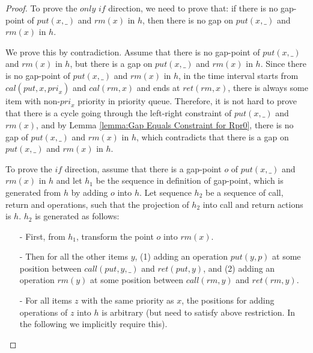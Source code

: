 \documentclass{llncs}
\begin{document}
\begin {proof}

To prove the $\textit{only if}$ direction, we need to prove that: if there is no gap-point of $\textit{put}(x,\_)$ and $\textit{rm}(x)$ in $h$, then there is no gap on $\textit{put}(x,\_)$ and $\textit{rm}(x)$ in $h$.

We prove this by contradiction. Assume that there is no gap-point of $\textit{put}(x,\_)$ and $\textit{rm}(x)$ in $h$, but there is a gap on $\textit{put}(x,\_)$ and $\textit{rm}(x)$ in $h$. Since there is no gap-point of $\textit{put}(x,\_)$ and $\textit{rm}(x)$ in $h$, in the time interval starts from $\textit{cal}(\textit{put},x,\textit{pri}_x)$ and $\textit{cal}(\textit{rm},x)$ and ends at $\textit{ret}(\textit{rm},x)$, there is always some item with non-$\textit{pri}_x$ priority in priority queue. Therefore, it is not hard to prove that there is a cycle going through the left-right constraint of $\textit{put}(x,\_)$ and $\textit{rm}(x)$, and by Lemma \ref{lemma:Gap Equals Constraint for Rpr0}, there is no gap of $\textit{put}(x,\_)$ and $\textit{rm}(x)$ in $h$, which contradicts that there is a gap on $\textit{put}(x,\_)$ and $\textit{rm}(x)$ in $h$.

To prove the $\textit{if}$ direction, assume that there is a gap-point $o$ of $\textit{put}(x,\_)$ and $\textit{rm}(x)$ in $h$ and let $h_1$ be the sequence in definition of gap-point, which is generated from $h$ by adding $o$ into $h$. Let sequence $h_2$ be a sequence of call, return and operations, such that the projection of $h_2$ into call and return actions is $h$. $h_2$ is generated as follows:

\begin{itemize}
\setlength{\itemsep}{0.5pt}
\item[-] First, from $h_1$, transform the point $o$ into $\textit{rm}(x)$.

\item[-] Then for all the other items $y$, (1) adding an operation $\textit{put}(y,p)$ at some position between $\textit{call}(\textit{put},y,\_)$ and $\textit{ret}(\textit{put},y)$, and (2) adding an operation $\textit{rm}(y)$ at some position between $\textit{call}(\textit{rm},y)$ and $\textit{ret}(\textit{rm},y)$.

\item[-] For all items $z$ with the same priority as $x$, the positions for adding operations of $z$ into $h$ is arbitrary (but need to satisfy above restriction. In the following we implicitly require this).


\end{itemize}
\end{proof}
\end{document}
